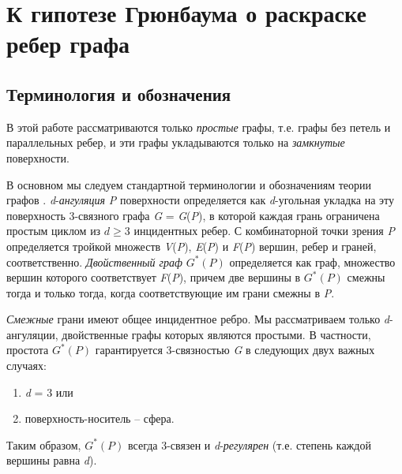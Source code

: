 \section{К гипотезе Грюнбаума о раскраске ребер графа}


\subsection{Терминология и обозначения}

В этой работе рассматриваются только \textit{простые} графы, т.е. графы без петель и параллельных ребер, и эти графы укладываются только на \textit{замкнутые} поверхности.

В основном мы следуем стандартной терминологии и обозначениям теории графов \cite{harary}. \textit{d}-\textit{ангуляция} \textit{P }поверхности определяется как \textit{d}-угольная укладка на эту поверхность 3-связного графа \textit{G} = \textit{G}(\textit{P}), в которой каждая грань ограничена простым циклом из $d\ge 3$ инцидентных ребер. С комбинаторной точки зрения \textit{P} определяется тройкой множеств \textit{V}(\textit{P}), \textit{E}(\textit{P}) и \textit{F}(\textit{P}) вершин, ребер и граней, соответственно. \textit{Двойственный граф} $G^*(P)$ определяется как граф, множество вершин которого соответствует \textit{F}(\textit{P}), причем две вершины в $G^*(P)$ смежны тогда и только тогда, когда соответствующие им грани смежны в \textit{P}.

\textit{Смежные} грани имеют общее инцидентное ребро. Мы рассматриваем только \linebreak\textit{d}-ангуляции, двойственные графы которых являются простыми. В частности, простота $G^*(P)$ гарантируется 3-связностью \textit{G} в следующих двух важных случаях:

\begin{enumerate}[1) ]
\item  \textit{ d }= 3 или

\item  поверхность-носитель -- сфера.
\end{enumerate}

Таким образом, $G^*(P)$ всегда 3-связен и \textit{d}-\textit{регулярен} (т.е. степень каждой вершины равна \textit{d}).

